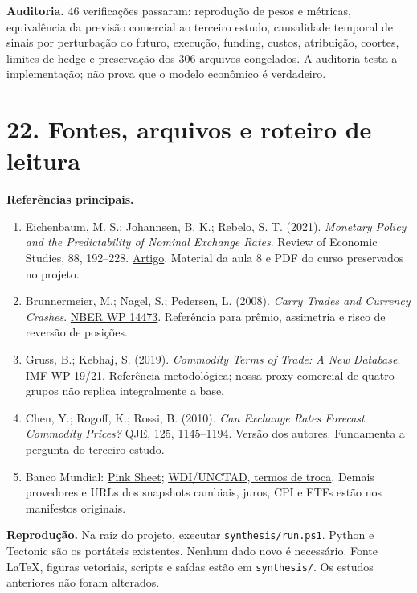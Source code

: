 \documentclass[11pt,a4paper]{article}
\begin{document}
\textbf{Auditoria.} 46 verificações passaram: reprodução de pesos e métricas, equivalência da previsão comercial ao terceiro estudo, causalidade temporal de sinais por perturbação do futuro, execução, funding, custos, atribuição, coortes, limites de hedge e preservação dos 306 arquivos congelados. A auditoria testa a implementação; não prova que o modelo econômico é verdadeiro.

\clearpage
\section*{22. Fontes, arquivos e roteiro de leitura}

\textbf{Referências principais.}
\begin{enumerate}
\item Eichenbaum, M. S.; Johannsen, B. K.; Rebelo, S. T. (2021). \emph{Monetary Policy and the Predictability of Nominal Exchange Rates}. Review of Economic Studies, 88, 192--228. \href{https://doi.org/10.1093/restud/rdaa024}{Artigo}. Material da aula 8 e PDF do curso preservados no projeto.
\item Brunnermeier, M.; Nagel, S.; Pedersen, L. (2008). \emph{Carry Trades and Currency Crashes}. \href{https://www.nber.org/papers/w14473}{NBER WP 14473}. Referência para prêmio, assimetria e risco de reversão de posições.
\item Gruss, B.; Kebhaj, S. (2019). \emph{Commodity Terms of Trade: A New Database}. \href{https://www.elibrary.imf.org/view/journals/001/2019/021/article-A001-en.xml}{IMF WP 19/21}. Referência metodológica; nossa proxy comercial de quatro grupos não replica integralmente a base.
\item Chen, Y.; Rogoff, K.; Rossi, B. (2010). \emph{Can Exchange Rates Forecast Commodity Prices?} QJE, 125, 1145--1194. \href{https://scholar.harvard.edu/sites/scholar.harvard.edu/files/rogoff/files/125-3-1145.pdf}{Versão dos autores}. Fundamenta a pergunta do terceiro estudo.
\item Banco Mundial: \href{https://www.worldbank.org/en/research/commodity-markets}{Pink Sheet}; \href{https://databank.worldbank.org/metadataglossary/world-development-indicators/series/TT.PRI.MRCH.XD.WD}{WDI/UNCTAD, termos de troca}. Demais provedores e URLs dos snapshots cambiais, juros, CPI e ETFs estão nos manifestos originais.
\end{enumerate}

\textbf{Reprodução.} Na raiz do projeto, executar \texttt{synthesis/run.ps1}. Python e Tectonic são os portáteis existentes. Nenhum dado novo é necessário. Fonte LaTeX, figuras vetoriais, scripts e saídas estão em \texttt{synthesis/}. Os estudos anteriores não foram alterados.
\end{document}
